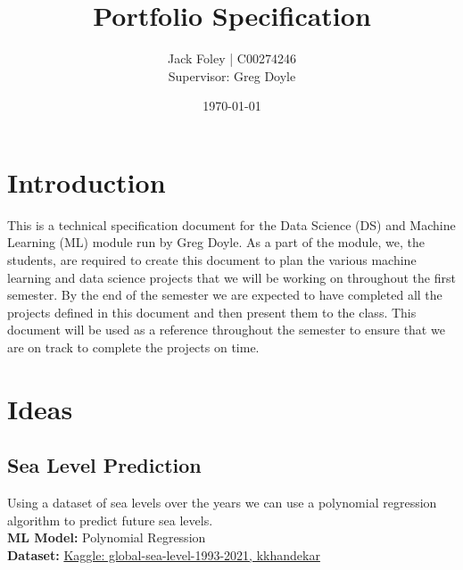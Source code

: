 \documentclass{article}
\title{Portfolio Specification}
\author{Jack Foley | C00274246 \\[1cm]Supervisor: Greg Doyle}
\date{\today}
\begin{document}
\maketitle

\newpage

\tableofcontents

\newpage

\section{Introduction}
This is a technical specification document for the Data Science (DS) and Machine Learning (ML) 
module run by Greg Doyle. As a part of the module, we, the students, are required to 
create this document to plan the various machine learning and data science projects 
that we will be working on throughout the first semester. By the end of the semester
we are expected to have completed all the projects defined in this document and then
present them to the class. This document will be used as a reference throughout the
semester to ensure that we are on track to complete the projects on time. 

\section{Ideas}

\subsection{Sea Level Prediction}

Using a dataset of sea levels over the years we can use a polynomial regression algorithm to predict future sea levels.
\\\textbf{ML Model:} Polynomial Regression
\\\textbf{Dataset:} \href{https://www.kaggle.com/datasets/kkhandekar/global-sea-level-1993-2021}{Kaggle: global-sea-level-1993-2021, kkhandekar} 

\newpage
\printbibliography
\end{document}
